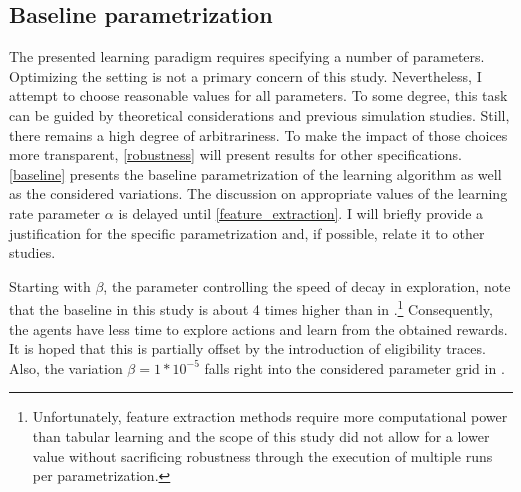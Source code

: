 \subsection{Baseline parametrization}\label{parametrization}



The presented learning paradigm requires specifying a number of parameters. Optimizing the setting is not a primary concern of this study. Nevertheless, I attempt to choose reasonable values for all parameters. To some degree, this task can be guided by theoretical considerations and previous simulation studies. Still, there remains a high degree of arbitrariness. To make the impact of those choices more transparent, \autoref{robustness} will present results for other specifications. \autoref{baseline} presents the baseline parametrization of the learning algorithm as well as the considered variations. The discussion on appropriate values of the learning rate parameter $\alpha$ is delayed until \autoref{feature_extraction}. I will briefly provide a justification for the specific parametrization and, if possible, relate it to other studies.

Starting with $\beta$, the parameter controlling the speed of decay in exploration, note that the baseline in this study is about 4 times higher than in \textcite{calvano_artificial_2020}.\footnote{Unfortunately, feature extraction methods require more computational power than tabular learning and the scope of this study did not allow for a lower value without sacrificing robustness through the execution of multiple runs per parametrization.} Consequently, the agents have less time to explore actions and learn from the obtained rewards. It is hoped that this is partially offset by the introduction of eligibility traces. Also, the variation $\beta = 1*10^{-5}$ falls right into the considered parameter grid in \textcite{calvano_artificial_2020}.

